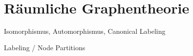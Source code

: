 \chapter{Räumliche Graphentheorie}

Isomorphismus, Automorphismus, Canonical Labeling

Labeling / Node Partitions


